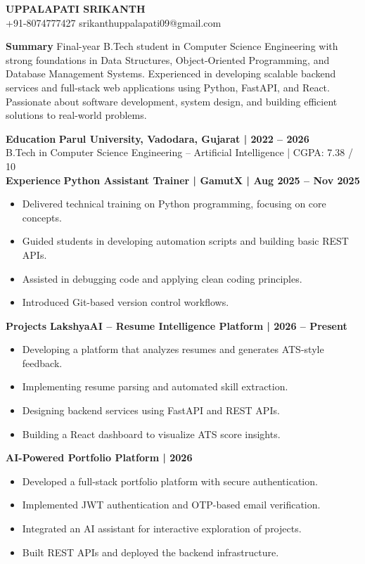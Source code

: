 \documentclass[10pt]{article}
\begin{document}
\begin{center}
    {\LARGE \textbf{UPPALAPATI SRIKANTH}} \\
    +91-8074777427 \textbar{} srikanthuppalapati09@gmail.com
\end{center}

\textbf{Summary}
Final-year B.Tech student in Computer Science Engineering with strong foundations in Data Structures, Object-Oriented Programming, and Database Management Systems. Experienced in developing scalable backend services and full-stack web applications using Python, FastAPI, and React. Passionate about software development, system design, and building efficient solutions to real-world problems.

\textbf{Education}
\textbf{Parul University, Vadodara, Gujarat | 2022 – 2026}\\
B.Tech in Computer Science Engineering – Artificial Intelligence | CGPA: 7.38 / 10\\

\textbf{Experience}
\textbf{Python Assistant Trainer | GamutX | Aug 2025 – Nov 2025}
\begin{itemize}
\item Delivered technical training on Python programming, focusing on core concepts.
\item Guided students in developing automation scripts and building basic REST APIs.
\item Assisted in debugging code and applying clean coding principles.
\item Introduced Git-based version control workflows.
\end{itemize}

\textbf{Projects}
\textbf{LakshyaAI – Resume Intelligence Platform | 2026 – Present}
\begin{itemize}
\item Developing a platform that analyzes resumes and generates ATS-style feedback.
\item Implementing resume parsing and automated skill extraction.
\item Designing backend services using FastAPI and REST APIs.
\item Building a React dashboard to visualize ATS score insights.
\end{itemize}

\textbf{AI-Powered Portfolio Platform | 2026}
\begin{itemize}
\item Developed a full-stack portfolio platform with secure authentication.
\item Implemented JWT authentication and OTP-based email verification.
\item Integrated an AI assistant for interactive exploration of projects.
\item Built REST APIs and deployed the backend infrastructure.
\end{itemize}
\end{document}
